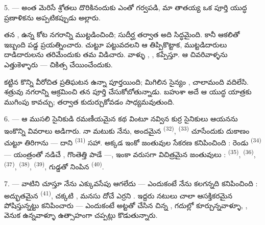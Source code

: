 5. --- అంత మెరిసే శ్రోతలు దొరికినందుకు ఎంతో గర్వపడి, మా తాతయ్య ఒక పూర్తి యుద్ధ ప్రణాళికను
అప్పటికప్పుడు అల్లారు.

తన ,  ఉన్న కోట నగరాన్ని 
ముట్టడించింది; సుదీర్ఘ  తర్వాత అది  సిద్ధమైంది.
కానీ ఆకలితో ఇబ్బంది పడ్డ  
  ప్రయత్నించారు.  చుట్టూ
పట్టువదలని  ఆ  తిప్పికొట్టాక,
 ముట్టడిదారులు  దాడిదారులను తరిమేందుకు తమ
 విడిచారు. వాళ్ళు ,
 ,  కప్పేస్తూ.
 ఆ చివరివాళ్ళను  ఎత్తుకెళ్ళారు —
 చికిత్స చేయించేందుకు.

 కట్టిన కొన్ని  వీరోచిత ప్రతిఘటన ఉన్నా 
పూర్తయింది; మిగిలిన సైన్యం , చాలామంది  వదిలేసి.
శత్రువు నగరాన్ని ఆక్రమించి తన  పూర్తి చేసుకోబోతున్నాడు. బహుశా అదే ఆ
యుద్ధ యాత్రకు ముగింపు కావచ్చు;  తర్వాత 
కుదుర్చుకోవడం సాధ్యమవుతుంది.

\VUsaut{4.4mm}
\VUsaut{2.8mm}

6. --- ఆ ముసలి సైనికుడి రమణీయమైన కథ వింటూ నవ్విన కుర్ర సైనికులు ఆయనను ఇంకొన్ని వివరాలు
అడిగారు. నా మటుకు నేను, అందమైన  \textsuperscript{(32)},
 \textsuperscript{(33)} చూసేందుకు దుకాణం చుట్టూ తిరిగాను — దాని
 \textsuperscript{(31)} సహా. అక్కడ ఇంకో జంతువుల సేకరణ కనిపించింది : రెండు
 \textsuperscript{(34)} — యంత్రంతో నడిచే ,
గొంతెత్తి పాడే  —, ఇంకా వరుసగా విచిత్రమైన జంతువులు :
 \textsuperscript{(35)},  \textsuperscript{(36)},
 \textsuperscript{(37)},  \textsuperscript{(38)},
 \textsuperscript{(39)}, గుడ్డతో నింపిన 
\textsuperscript{(40)}.

7. --- వాటిని చూస్తూ నేను ఎక్కువసేపు ఆగలేదు — ఎందుకంటే నేను కలగన్నది కనిపించింది :
అద్భుతమైన  \textsuperscript{(41)}, చక్కటి ,
మనసు దోచే ఎర్రని .  ఇద్దరు నటులు చాలా ఆసక్తికరమైన
  పోషిస్తున్నట్టు కనిపించారు — ఎందుకంటే అట్టతో చేసిన
చిన్న , గదుల్లో కూర్చున్నవాళ్ళూ, ,
 వెనుక  ఉన్నవాళ్ళూ ఉత్సాహంగా
చప్పట్లు కొడుతున్నారు.

